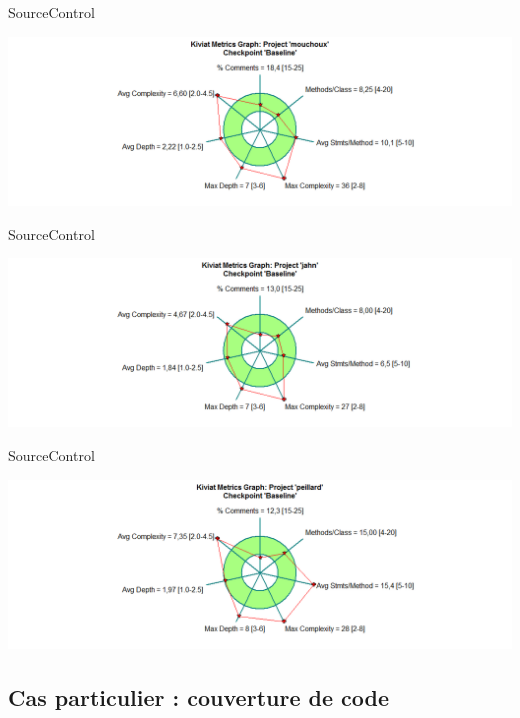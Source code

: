 \begin{frame}{SourceControl}
\begin{center}
\includegraphics[width=\textwidth]{fig/mouchoux-go-20150105.png}
\end{center}
\end{frame}

\begin{frame}{SourceControl}
\begin{center}
\includegraphics[width=\textwidth]{fig/jahn-go-20150105.png}
\end{center}
\end{frame}

\begin{frame}{SourceControl}
\begin{center}
\includegraphics[width=\textwidth]{fig/peillard-go-20150105.png}
\end{center}
\end{frame}

\subsection{Cas particulier : couverture de code}


